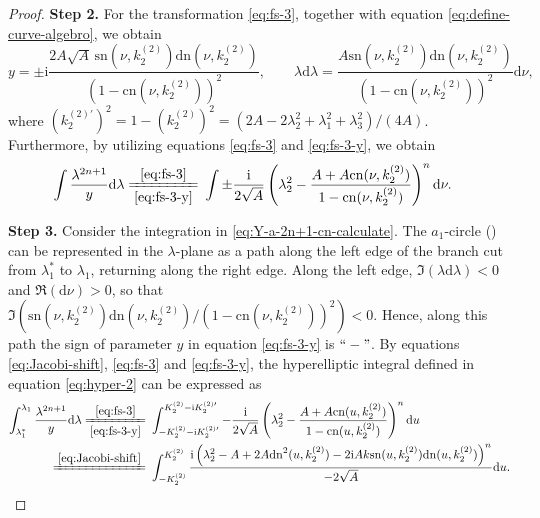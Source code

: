 \documentclass[11pt,reqno]{amsart}
\newcommand{\ii}{\mathrm{i}}
\newcommand{\sn}{\mathrm{sn}}
\newcommand{\cn}{\mathrm{cn}}
\newcommand{\dn}{\mathrm{dn}}
\newcommand{\dd}{\mathrm{d}}
\numberwithin{equation}{section}
\begin{document}
\begin{proof}
	\textbf{Step 2.}
	For the transformation \eqref{eq:fs-3}, together with equation \eqref{eq:define-curve-algebro}, we obtain 
	\begin{equation}\label{eq:fs-3-y}
			y=  \pm \ii \frac{2A\sqrt{A}\, \sn(\nu,  k^{(2)}_2)\dn(\nu,  k^{(2)}_2)}{\left(1-\cn(\nu,  k^{(2)}_2)\right)^2},
		\qquad 
			\lambda	\dd \lambda =  \frac{A\sn(\nu,  k^{(2)}_2)\dn(\nu,  k^{(2)}_2)}{\left(1-\cn(\nu,  k^{(2)}_2)\right)^2} \dd \nu,
	\end{equation}
	where $(k^{(2)\prime }_2)^2=1-  (k^{(2)}_2)^2=(2A-2\lambda_2^2+\lambda_1^2+\lambda_3^2)/(4A)$.
	Furthermore, by utilizing equations \eqref{eq:fs-3} and \eqref{eq:fs-3-y}, we obtain
	\begin{equation}\label{eq:Y-a-2n+1-cn-calculate}
		\begin{split}
			\int\frac{\lambda^{2n+1}}{y}\dd \lambda
			\xlongequal[\eqref{eq:fs-3-y}]{\eqref{eq:fs-3}} &\ \int \pm \frac{\ii}{2\sqrt{A}} \left(\lambda_2^2-\frac{A+A\cn(\nu,  k^{(2)}_2)}{1-\cn(\nu,  k^{(2)}_2)}\right)^n \dd \nu.
		\end{split}
	\end{equation}
	
	
	
	\textbf{Step 3.}
	Consider the integration in \eqref{eq:Y-a-2n+1-cn-calculate}.
	The $a_1$-circle () can be represented in the $\lambda$-plane as a path along the left edge of the branch cut from $\lambda_1^*$ to $\lambda_1$, returning along the right edge. 
	Along the left edge,  $\Im(\lambda \dd \lambda)<0$ and $\Re(\dd \nu)>0$, so that $\Im(\sn(\nu,  k^{(2)}_2)\dn(\nu,  k^{(2)}_2)/(1-\cn(\nu,  k^{(2)}_2))^2)<0.$
	Hence, along this path the sign of parameter $y$ in equation \eqref{eq:fs-3-y} is $``-"$.
	By equations \eqref{eq:Jacobi-shift}, \eqref{eq:fs-3} and \eqref{eq:fs-3-y}, the hyperelliptic integral defined in equation \eqref{eq:hyper-2} can be expressed as 
	\begin{equation}\label{eq:Y-a-2n+1-cn-calculate-1}
		\begin{split}
			 \int_{\lambda_1^*}^{\lambda_1}\frac{\lambda^{2n+1}}{y}\dd \lambda 
			\xlongequal[\eqref{eq:fs-3-y}]{\eqref{eq:fs-3}}&\ \int_{-  K^{(2)}_2-\ii   K^{(2)\prime}_2}^{  K^{(2)}_2-\ii   K^{(2)\prime}_2}-\frac{\ii}{2\sqrt{A}} \left(\lambda_2^2-\frac{A+A\cn(u,  k^{(2)}_2)}{1-\cn(u,  k^{(2)}_2)}\right)^n \dd u\\
			\xlongequal{\eqref{eq:Jacobi-shift}}&\ \int_{-  K^{(2)}_2}^{ K^{(2)}_2}\frac{\ii\left(\lambda_2^2-A+2A\dn^2(u,  k^{(2)}_2)-2\ii Ak\sn(u,  k^{(2)}_2)\dn(u,  k^{(2)}_2)\right)^n}{-2\sqrt{A}}  \dd u.
		\end{split}
	\end{equation}
	

\end{proof}
\end{document}
